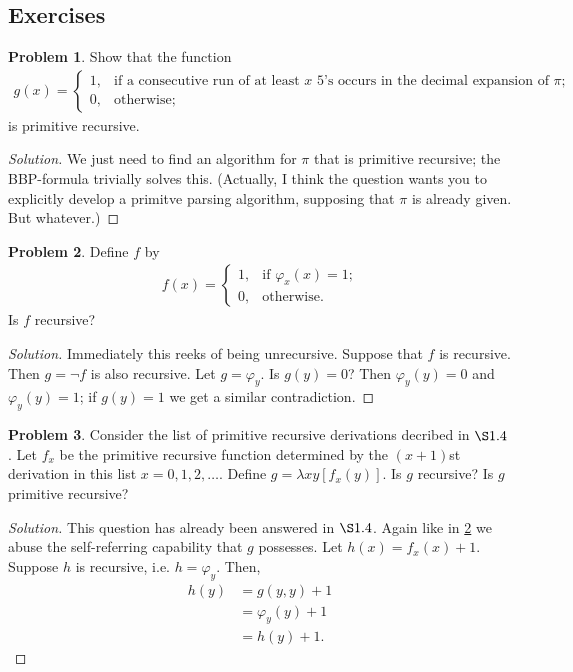 \documentclass{article}
\theoremstyle{definition}
\newtheorem{prob}{Problem}[section]  %
\newenvironment{soln}
  {\begin{proof}[Solution]\setlength{\parskip}{0pt}} %
  {\end{proof}\vspace{-5pt}} %
\begin{document}
\subsection{Exercises}
\begin{prob}
	Show that the function
	\begin{align*}
		g(x)=\begin{cases}
			1,&\text{if a consecutive run of at least $x$ 5's occurs in the decimal expansion of $\pi$;}\\
			0,&\text{otherwise;}
		\end{cases}
	\end{align*}
	is primitive recursive.
\end{prob}
\begin{soln}
	We just need to find an algorithm for $\pi$ that is primitive recursive; the BBP-formula trivially solves this. (Actually, I think the question wants you to explicitly develop a primitve parsing algorithm, supposing that $\pi$ is already given. But whatever.)
\end{soln}
\begin{prob}\label{2.2}
	Define $f$ by
	\begin{align*}
		f(x)=\begin{cases}
			1,&\text{if $\varphi_x(x)=1$;}\\
			0,&\text{otherwise.}
		\end{cases}
	\end{align*}
	Is $f$ recursive?
\end{prob}
\begin{soln}
	Immediately this reeks of being unrecursive. Suppose that $f$ is recursive. Then $g=\neg f$ is also recursive. Let $g=\varphi_y$. Is $g(y)=0$? Then $\varphi_y(y)=0$ and $\varphi_y(y)=1$; if $g(y)=1$ we get a similar contradiction.
\end{soln}
\begin{prob}
	Consider the list of primitive recursive derivations decribed in $\S 1.4$. Let $f_x$ be the primitive recursive function determined by the $(x+1)$st derivation in this list $x=0,1,2,\dots$. Define $g=\lambda xy[f_x(y)]$. Is $g$ recursive? Is $g$ primitive recursive?
\end{prob}
\begin{soln}
	This question has already been answered in $\S1.4$. Again like in \ref{2.2} we abuse the self-referring capability that $g$ possesses. Let $h(x)=f_x(x)+1$. Suppose $h$ is recursive, i.e. $h=\varphi_y$. Then,
	\begin{align*}
		h(y)&=g(y,y)+1\\
		&=\varphi_y(y)+1\\
		&=h(y)+1.
	\end{align*}
\end{soln}
\end{document}
